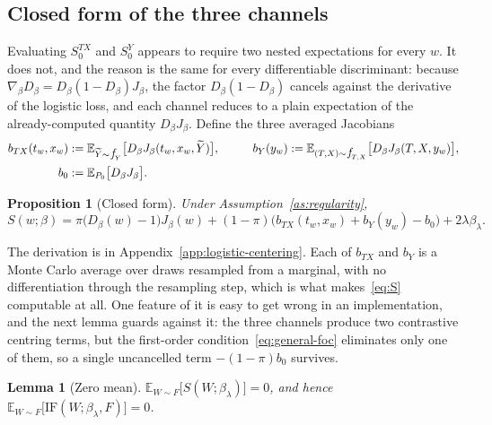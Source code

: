 \documentclass[11pt]{article}
\theoremstyle{plain}
\newtheorem{mypropo}{Proposition}
\newtheorem{lem}{Lemma}
\theoremstyle{definition}
\theoremstyle{remark}
\newcommand{\pE}{\ensuremath{\mathbb{E}}}
\newcommand{\pf}[1]{\ensuremath{\,\mathlarger{\textit{f}}_{#1}}}
\newcommand{\ratio}{\ensuremath{\pi}}
\newcommand{\IF}{\mathrm{IF}}
\newcommand{\score}{S}
\begin{document}
\subsection{Closed form of the three channels}
\label{sec:mcd-general-closed-form}

Evaluating $\score_0^{TX}$ and $\score_0^{Y}$ appears to require two nested expectations for
every $w$. It does not, and the reason is the same for every differentiable discriminant:
because $\nabla_\beta D_\beta = D_\beta(1-D_\beta)J_\beta$, the factor $D_\beta(1-D_\beta)$
cancels against the derivative of the logistic loss, and each channel reduces to a plain
expectation of the already-computed quantity $D_\beta J_\beta$. Define the three averaged
Jacobians
\begin{equation}
\begin{aligned}
b_{TX}(t_w,x_w) &:= \pE_{\widetilde Y \sim \pf{Y}}\big[ D_\beta J_\beta (t_w,x_w,\widetilde Y) \big],
&\qquad
b_Y(y_w) &:= \pE_{(T,X) \sim \pf{T,X}}\big[ D_\beta J_\beta (T,X,y_w) \big], \\
b_0 &:= \pE_{P_0}\big[ D_\beta J_\beta \big].
\end{aligned}
\label{eq:b-channels}
\end{equation}

\begin{mypropo}[Closed form]
\label{prop:closed-form}
Under Assumption~\ref{as:regularity},
\begin{equation}
\score(w;\beta)
= \ratio\big( D_\beta(w) - 1 \big)J_\beta(w)
+ (1-\ratio)\Big( b_{TX}(t_w,x_w) + b_Y(y_w) - b_0 \Big)
+ 2\lambda\beta_\lambda .
\label{eq:S}
\end{equation}
\end{mypropo}

The derivation is in Appendix~\ref{app:logistic-centering}. Each of $b_{TX}$ and $b_Y$ is a
Monte Carlo average over draws resampled from a marginal, with no differentiation through the
resampling step, which is what makes~\eqref{eq:S} computable at all. One feature of it is easy
to get wrong in an implementation, and the next lemma guards against it: the three channels
produce two contrastive centring terms, but the first-order
condition~\eqref{eq:general-foc} eliminates only one of them, so a single uncancelled term
$-(1-\ratio)b_0$ survives.

\begin{lem}[Zero mean]
\label{lem:zero-mean}
$\pE_{W \sim F}\big[\score(W;\beta_\lambda)\big] = 0$, and hence
$\pE_{W \sim F}\big[\IF(W;\beta_\lambda,F)\big] = 0$.
\end{lem}
\end{document}
